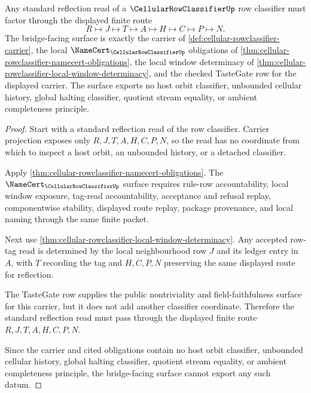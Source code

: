 \begin{theorem}
\label{thm:cellular-rowclassifier-standard-reflection-bridge-surface}
Any standard reflection read of a $\CellularRowClassifierUp$ row classifier
must factor through the displayed finite route
$$
R \longmapsto J \longmapsto T \longmapsto A \longmapsto H \longmapsto C \longmapsto P \longmapsto N.
$$
The bridge-facing surface is exactly the carrier of
\autoref{def:cellular-rowclassifier-carrier}, the local
$\NameCert_{\CellularRowClassifierUp}$ obligations of
\autoref{thm:cellular-rowclassifier-namecert-obligations}, the local window
determinacy of
\autoref{thm:cellular-rowclassifier-local-window-determinacy}, and the
checked TasteGate row for the displayed carrier. The surface exports no host
orbit classifier, unbounded cellular history, global halting classifier,
quotient stream equality, or ambient completeness principle.
\end{theorem}
\begin{proof}
Start with a standard reflection read of the row classifier. Carrier
projection exposes only $R,J,T,A,H,C,P,N$, so the read has no coordinate from
which to inspect a host orbit, an unbounded history, or a detached classifier.

Apply \autoref{thm:cellular-rowclassifier-namecert-obligations}. The
$\NameCert_{\CellularRowClassifierUp}$ surface requires rule-row
accountability, local window exposure, tag-read accountability, acceptance and
refusal replay, componentwise stability, displayed route replay, package
provenance, and local naming through the same finite packet.

Next use \autoref{thm:cellular-rowclassifier-local-window-determinacy}. Any
accepted row-tag read is determined by the local neighbourhood row $J$ and its
ledger entry in $A$, with $T$ recording the tag and $H,C,P,N$ preserving the
same displayed route for reflection.

The TasteGate row supplies the public nontriviality and field-faithfulness
surface for this carrier, but it does not add another classifier coordinate.
Therefore the standard reflection read must pass through the displayed finite
route $R,J,T,A,H,C,P,N$.

Since the carrier and cited obligations contain no host orbit classifier,
unbounded cellular history, global halting classifier, quotient stream
equality, or ambient completeness principle, the bridge-facing surface cannot
export any such datum.
\end{proof}

